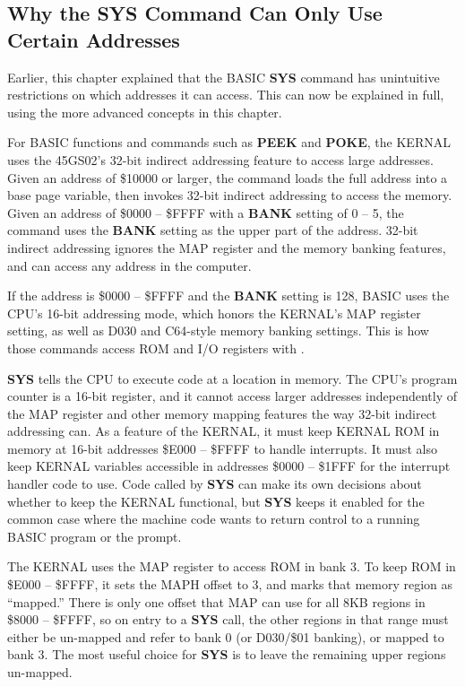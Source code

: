 \subsection{Why the SYS Command Can Only Use Certain Addresses}

Earlier, this chapter explained that the BASIC {\bf SYS} command has
unintuitive restrictions on which addresses it can access. This can now be
explained in full, using the more advanced concepts in this chapter.

For BASIC functions and commands such as {\bf PEEK} and {\bf POKE}, the KERNAL
uses the 45GS02's 32-bit indirect addressing feature to access large
addresses. Given an address of \$10000 or larger, the command loads the full
address into a base page variable, then invokes 32-bit indirect addressing to
access the memory. Given an address of \$0000 -- \$FFFF with a {\bf BANK}
setting of 0 -- 5, the command uses the {\bf BANK} setting as the upper part
of the address. 32-bit indirect addressing ignores the MAP register and the
memory banking features, and can access any address in the computer.

If the address is \$0000 -- \$FFFF and the {\bf BANK} setting is 128, BASIC
uses the CPU's 16-bit addressing mode, which honors the KERNAL's MAP register
setting, as well as D030 and C64-style memory banking settings. This is how
those commands access ROM and I/O registers with .

{\bf SYS} tells the CPU to execute code at a location in memory. The CPU's
program counter is a 16-bit register, and it cannot access larger addresses
independently of the MAP register and other memory mapping features the way
32-bit indirect addressing can. As a feature of the KERNAL, it must keep
KERNAL ROM in memory at 16-bit addresses \$E000 -- \$FFFF to handle
interrupts. It must also keep KERNAL variables accessible in addresses \$0000
-- \$1FFF for the interrupt handler code to use. Code called by {\bf SYS} can
make its own decisions about whether to keep the KERNAL functional, but {\bf
SYS} keeps it enabled for the common case where the machine code wants to
return control to a running BASIC program or the  prompt.

The KERNAL uses the MAP register to access ROM in bank 3. To keep ROM in
\$E000 -- \$FFFF, it sets the MAPH offset to 3, and marks that memory region
as ``mapped.'' There is only one offset that MAP can use for all 8KB regions in
\$8000 -- \$FFFF, so on entry to a {\bf SYS} call, the other regions in that
range must either be un-mapped and refer to bank 0 (or D030/\$01 banking), or
mapped to bank 3. The most useful choice for {\bf SYS} is to leave the
remaining upper regions un-mapped.

